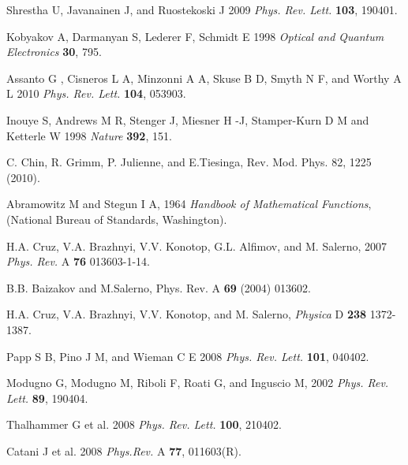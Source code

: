 \documentclass[12pt]{iopart}
\begin{document}
\begin{thebibliography}{99}
 Shrestha U,  Javanainen J, and  Ruostekoski J 2009
{\it Phys. Rev. Lett.} \textbf{103}, 190401.

 Kobyakov A, Darmanyan S, Lederer F,  Schmidt E
1998 {\it Optical and Quantum Electronics} \textbf{30}, 795.

 Assanto G ,  Cisneros L A,
 Minzonni A A,  Skuse B D, Smyth N F, and  Worthy A L 2010
{\it Phys. Rev. Lett.} \textbf{104}, 053903.

 Inouye S,  Andrews M R,  Stenger J,  Miesner H -J,
Stamper-Kurn D M and  Ketterle W 1998  {\it Nature} \textbf{392}, 151.

 C. Chin, R. Grimm, P. Julienne, and E.Tiesinga, Rev. Mod. Phys. 82, 1225 (2010).

 Abramowitz M and  Stegun I A, 1964 \textit{Handbook
of Mathematical Functions}, (National Bureau of Standards, Washington).

 H.A. Cruz, V.A. Brazhnyi, V.V. Konotop, G.L. Alfimov, and M. Salerno, 2007 {\it Phys. Rev.} A {\bf 76} 013603-1-14.

B.B. Baizakov and M.Salerno, Phys. Rev. A {\bf 69} (2004) 013602.

H.A. Cruz, V.A. Brazhnyi, V.V. Konotop,  and M. Salerno, {\it Physica} D {\bf 238} 1372-1387.

Papp S B, Pino J M, and  Wieman C E 2008 {\it Phys. Rev. Lett.} {\bf 101}, 040402.

 Modugno G, Modugno M, Riboli F,  Roati G, and
 Inguscio M, 2002 {\it Phys. Rev. Lett.} {\bf 89}, 190404.

 Thalhammer G et al. 2008 {\it Phys. Rev. Lett.} \textbf{100},
210402.

  Catani J et al. 2008 {\it Phys.Rev.} A \textbf{77}, 011603(R).




 \end{thebibliography}
\end{document}
